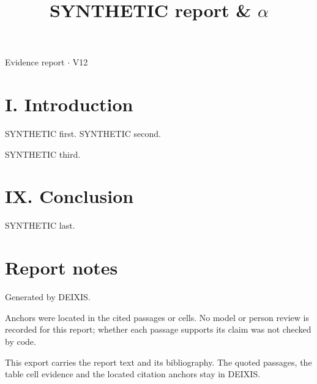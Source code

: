 \documentclass[journal]{IEEEtran}
\begin{document}
\title{SYNTHETIC report \& \ensuremath{\alpha}}

\maketitle

\noindent Evidence report \ensuremath{\cdot} V12

\section*{I. Introduction}

SYNTHETIC first. \cite{Synth26} SYNTHETIC second. \cite{Synth226,Synth26}

SYNTHETIC third. \cite{Synth326}

\section*{IX. Conclusion}

SYNTHETIC last. \cite{Synth326}

\section*{Report notes}

Generated by DEIXIS.

Anchors were located in the cited passages or cells. No model or person review is recorded for this report; whether each passage supports its claim was not checked by code.

This export carries the report text and its bibliography. The quoted passages, the table cell evidence and the located citation anchors stay in DEIXIS.




\end{document}
